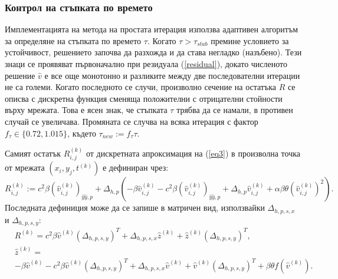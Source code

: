 \documentclass[a4paper]{article}
\newcommand{\rf}[1]{(\ref{#1})}
\theoremstyle{remark}
\begin{document}
\begin{large}
\subsubsection{Контрол на стъпката по времето}
Имплементацията на метода на простата итерация използва адаптивен алгоритъм за определяне на стъпката по времето $\tau$. Когато $\tau > \tau_{stab}$ премине условието за устойчивост, решението започва да разхожда и да става негладко (назъбено). Тези знаци се проявяват първоначално при резидуала \rf{residual}, докато численото решение $\widehat v$ е все още монотонно и разликите между две последователни итерации не са големи. Когато последното се случи, произволно сечение на остатъка $R$ се описва с дискретна функция сменяща положителни с отрицателни стойности върху мрежата. Това е ясен знак, че стъпката $\tau$ трябва да се намали, в противен случай се увеличава. Промяната се случва на всяка итерация с фактор $f_{\tau} \in \{0.72, 1.015\}$, където $\tau_{new} := f_{\tau}\tau$.

Самият остатък $R^{(k)}_{i,j}$ от дискретната апроксимация на \rf{eq3} в произволна точка от мрежата $(x_i,y_j,t^{(k)})$ е дефиниран чрез:
\begin{equation}\label{residual}
R_{i,j}^{(k)} := 
c^2\beta (\widehat{v}^{(k)}_{i,j})_{\widehat{yy},p} + \Delta_{h,p}(-\beta \widehat{v}^{(k)}_{i,j} - c^2\beta (\widehat{v}^{(k)}_{i,j})_{\widehat{yy},p} + \Delta_{h,p} \widehat{v}^{(k)}_{i,j} 
+ \alpha \beta \theta (\widehat{v}^{(k)}_{i,j})^2  ).
\end{equation}
Последната дефиниция може да се запише в матричен вид, използвайки $\Delta_{h,p,s,x}$ и $\Delta_{h,p,s,y}$:
\begin{align}\label{residualM}
&R^{(k)} = 
c^2\beta \widehat{v}^{(k)}(\Delta_{h,p,s,y})^T + \Delta_{h,p,s,x}  \widehat{z}^{(k)} + \widehat{z}^{(k)}  (\Delta_{h,p,s,y} )^T, \nonumber\\
&\widehat{z}^{(k)}  = \nonumber\\
&-\beta \widehat{v}^{(k)} - c^2\beta \widehat{v}^{(k)}(\Delta_{h,p,s,y})^T + \Delta_{h,p,s,x}  \widehat{v}^{(k)} +  \widehat{v}^{(k)}  (\Delta_{h,p,s,y})^T 
+ \beta \theta f(\widehat{v}^{(k)}).
\end{align}
 

\end{large}
\end{document}
